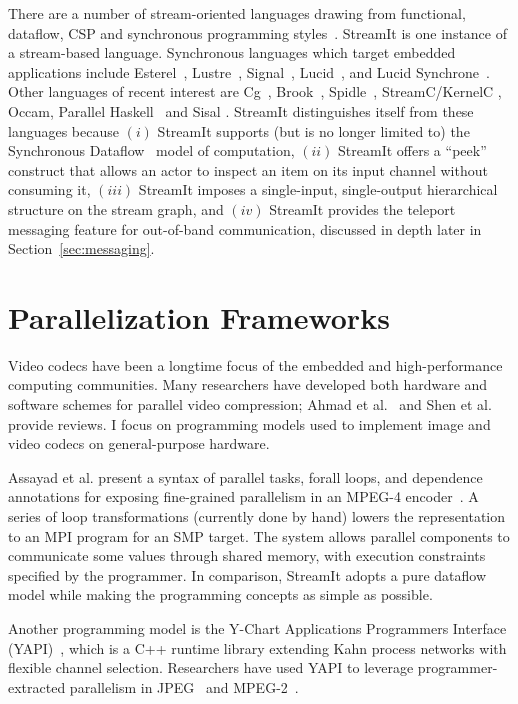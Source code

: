 There are a number of stream-oriented languages
drawing from functional, dataflow, CSP and synchronous programming
styles~\cite{survey97}.  StreamIt is one instance of a stream-based language.
Synchronous languages which target embedded
applications include Esterel~\cite{Esterel}, Lustre~\cite{Lustre},
Signal~\cite{Signal}, Lucid~\cite{Lucid77}, and Lucid
Synchrone~\cite{Lucid-Synchrone}.  Other languages of recent
interest are Cg~\cite{cg03}, Brook~\cite{brook04},
Spidle~\cite{spidle03}, StreamC/KernelC \cite{imagine03ieee},
Occam\cite{Occam}, Parallel Haskell~\cite{ph} and Sisal \cite{sisal}.
StreamIt distinguishes itself from these languages because $(i)$
StreamIt supports (but is no longer limited to) the Synchronous
Dataflow~\cite{lee87static} model of computation, $(ii)$ StreamIt
offers a ``peek'' construct that allows an actor to inspect
an item on its input channel without consuming it, 
$(iii)$ StreamIt imposes a single-input, single-output hierarchical
structure on the stream graph, and $(iv)$ StreamIt provides the
teleport messaging feature for out-of-band communication, discussed
in depth later in Section~\ref{sec:messaging}.

\section{Parallelization Frameworks}

Video codecs have been a longtime focus of the embedded
and high-performance computing communities.  Many researchers have
developed both hardware and software schemes for
parallel video compression; Ahmad et al.~\cite{ahmad01compression} and
Shen et al.~\cite{shen94overview} provide reviews. I focus on
programming models used to implement image and video codecs on 
general-purpose hardware.

Assayad et al. present a syntax of parallel tasks, forall loops, and
dependence annotations for exposing fine-grained parallelism in an
MPEG-4 encoder~\cite{assayad05mpeg4a, assayad05mpeg4b}. A series of loop
transformations (currently done by hand) lowers the representation to
an MPI program for an SMP target.  The system allows parallel
components to communicate some values through shared memory, with
execution constraints specified by the programmer. In comparison,
StreamIt adopts a pure dataflow model while making the programming
concepts as simple as possible.

Another programming model is
the Y-Chart Applications Programmers Interface
(YAPI)~\cite{kock00yapi}, which is a C++ runtime library extending
Kahn process networks with flexible channel selection.  Researchers
have used YAPI to leverage programmer-extracted parallelism in
JPEG~\cite{kock02jpeg} and MPEG-2~\cite{dwivedi01exploring}.  

